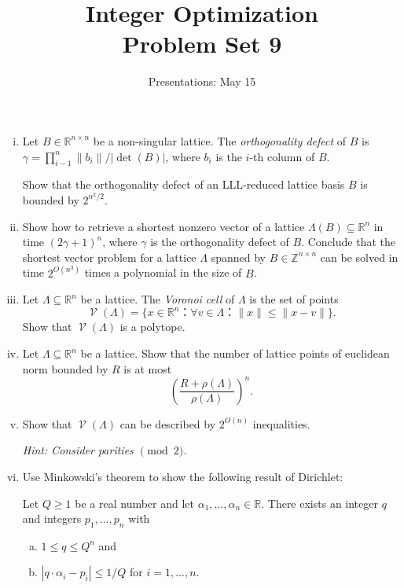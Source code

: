 \documentclass[11pt,a4paper]{article}
\title{Integer Optimization  \\ Problem Set 9 }
\date{Presentations: May 15}
\DeclareMathOperator{\vor}{\mathscr{V}}
\begin{document}
\maketitle 




\begin{enumerate}[i)]
\item Let $B ∈ ℝ^{n ×n}$ be a non-singular lattice. The \emph{orthogonality defect} of $B$ is $γ = ∏_{i-1}^n  \|b_i\| / |\det(B)|$, where $b_i$ is the $i$-th column of $B$.

  Show that the orthogonality defect of an LLL-reduced lattice basis $B$ is bounded by $2^{n^2 / 2}$.
\item Show how to retrieve a shortest nonzero vector of a lattice $Λ(B) ⊆ℝ^n$ in time $(2 γ+1)^n$, where $γ$ is the orthogonality defect of $B$.
Conclude that the shortest vector problem for a lattice $Λ$ spanned by  $B ∈ℤ^{n × n}$ can be solved in time $2^{O(n^3)}$ times a polynomial in the size of $B$. 

\item Let $Λ ⊆ ℝ^n$ be  a lattice. The \emph{Voronoi cell} of $Λ$ is the set of points
  \begin{displaymath}
    \vor(Λ) = \{x ∈ ℝ^n ： ∀ v ∈ Λ ：  \|x\| ≤ \|x-v \| \}.  
  \end{displaymath}
  Show that $\vor(Λ) $ is a polytope.

\item Let $Λ ⊆ℝ^n$ be a lattice.  Show that the number of lattice points of euclidean norm bounded by $R$ is at most
  \begin{displaymath}
     \left(\frac{R+ ρ(Λ)} { ρ(Λ)} \right) ^n. 
  \end{displaymath}
  
\item Show that $\vor(Λ)$ can be described by $2^{O(n)}$ inequalities.

  \hfill   \emph{Hint: Consider parities $\pmod{2}$.}
\item Use Minkowski's theorem to show the following result of Dirichlet:

  Let $Q ≥ 1$ be a real number and let $α_1,\dots ,α_n ∈ ℝ$. There exists an integer $q$ and integers $p_1 , \dots , p_n$ with
  \begin{enumerate}[a)]
  \item 
    $1≤ q ≤ Q^n$  and
    \item 
      $|q ⋅ α_i − p_i| ≤ 1/Q$ for $i = 1,\dots,n$.
    \end{enumerate}
    
\end{enumerate} 


%
%


 
\end{document}
